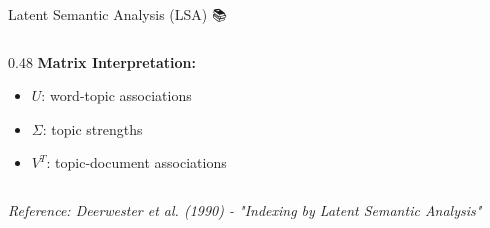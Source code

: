 \documentclass[aspectratio=169]{beamer}
\begin{document}
\begin{frame}[shrink=10]{Latent Semantic Analysis (LSA) 📚}
\begin{columns}[T]
\begin{column}{0.48\textwidth}
\vspace{0.5em}
\textbf{Matrix Interpretation:}
\begin{itemize}\setlength{\itemsep}{0pt}
    \item $U$: word-topic associations
    \item $\Sigma$: topic strengths
    \item $V^T$: topic-document associations
\end{itemize}
\end{column}
\end{columns}

\vspace{0.5em}
\small
\textit{Reference: Deerwester et al. (1990) - "Indexing by Latent Semantic Analysis"}
\end{frame}

\end{document}
